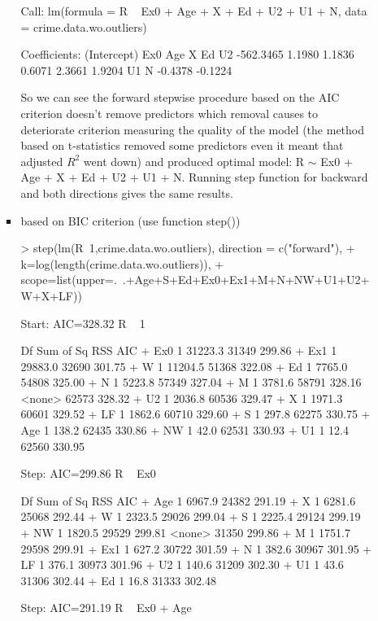 \documentclass[a4paper]{article}
\begin{document}
\begin{itemize}
\begin{itemize}
\begin{itemize}
\begin{Schunk}
\begin{Soutput}
Call:
lm(formula = R ~ Ex0 + Age + X + Ed + U2 + U1 + N, data = crime.data.wo.outliers)

Coefficients:
(Intercept)          Ex0          Age            X           Ed           U2  
  -562.3465       1.1980       1.1836       0.6071       2.3661       1.9204  
         U1            N  
    -0.4378      -0.1224  
\end{Soutput}
\end{Schunk}
So we can see the forward stepwise procedure based on the AIC criterion
doesn't remove predictors which removal causes to deteriorate criterion
measuring the quality of the model (the method based on t-statistics removed
some predictors even it meant that adjusted $R^2$ went down) and produced
optimal model: R $\sim$ Ex0 + Age + X + Ed + U2 + U1 + N.
Running step function for backward and both directions gives the same
results.
\item based on BIC criterion (use function step())
\begin{Schunk}
\begin{Sinput}
> step(lm(R~1,crime.data.wo.outliers), direction = c("forward"), 
+ 		k=log(length(crime.data.wo.outliers)), 
+ 		scope=list(upper=.~.+Age+S+Ed+Ex0+Ex1+M+N+NW+U1+U2+W+X+LF))
\end{Sinput}
\begin{Soutput}
Start:  AIC=328.32
R ~ 1

       Df Sum of Sq   RSS    AIC
+ Ex0   1   31223.3 31349 299.86
+ Ex1   1   29883.0 32690 301.75
+ W     1   11204.5 51368 322.08
+ Ed    1    7765.0 54808 325.00
+ N     1    5223.8 57349 327.04
+ M     1    3781.6 58791 328.16
<none>              62573 328.32
+ U2    1    2036.8 60536 329.47
+ X     1    1971.3 60601 329.52
+ LF    1    1862.6 60710 329.60
+ S     1     297.8 62275 330.75
+ Age   1     138.2 62435 330.86
+ NW    1      42.0 62531 330.93
+ U1    1      12.4 62560 330.95

Step:  AIC=299.86
R ~ Ex0

       Df Sum of Sq   RSS    AIC
+ Age   1    6967.9 24382 291.19
+ X     1    6281.6 25068 292.44
+ W     1    2323.5 29026 299.04
+ S     1    2225.4 29124 299.19
+ NW    1    1820.5 29529 299.81
<none>              31350 299.86
+ M     1    1751.7 29598 299.91
+ Ex1   1     627.2 30722 301.59
+ N     1     382.6 30967 301.95
+ LF    1     376.1 30973 301.96
+ U2    1     140.6 31209 302.30
+ U1    1      43.6 31306 302.44
+ Ed    1      16.8 31333 302.48

Step:  AIC=291.19
R ~ Ex0 + Age


\end{Soutput}
\end{Schunk}
\end{itemize}
\end{itemize}
\end{itemize}
\end{document}
